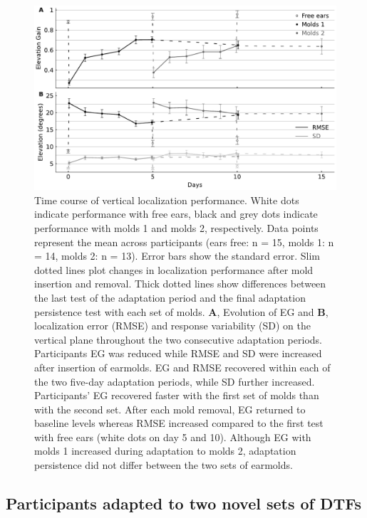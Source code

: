  \begin{figure}[ht]
	\includegraphics[width=18cm, center]{../Results/figures/fig5/fig5}
	\caption{Time course of vertical localization performance. White dots indicate performance with free ears, black and grey dots indicate performance with molds 1 and molds 2, respectively. Data points represent the mean across participants (ears free: n = 15, molds 1: n = 14, molds 2: n = 13). Error bars show the standard error. Slim dotted lines plot changes in localization performance after mold insertion and removal. Thick dotted lines show differences between the last test of the adaptation period and the final adaptation persistence test with each set of molds. \textbf{A}, Evolution of EG and \textbf{B}, localization error (RMSE) and response variability (SD) on the vertical plane throughout the two consecutive adaptation periods. Participants EG was reduced while RMSE and SD were increased after insertion of earmolds. EG and RMSE recovered within each of the two five-day adaptation periods, while SD further increased. Participants' EG recovered faster with the first set of molds than with the second set. After each mold removal, EG returned to baseline levels whereas RMSE increased compared to the first test with free ears (white dots on day 5 and 10). Although EG with molds 1 increased during adaptation to molds 2, adaptation persistence did not differ between the two sets of earmolds.}
        \label{fig:adaptation}
\end{figure}

 
\subsection{Participants adapted to two novel sets of DTFs}
 
